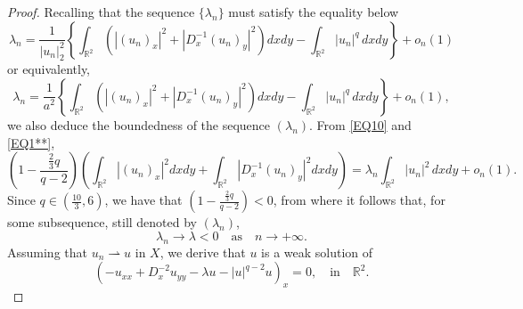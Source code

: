 \documentclass[11pt]{amsart}
\numberwithin{equation}{section}
\begin{document}
{{{\begin{proof}
    Recalling that the sequence $\{\lambda_n\}$  must satisfy the equality below
    $$
    \lambda_n=\frac{1}{|u_n|^{2}_{2}}\left\{\int_{\mathbb{R}^{2}}( |(u_n)_{x}|^{2}+|D^{-1}_{x} (u_n)_{y}|^{2}) dx dy-\int_{\mathbb{R}^2} |u_n|^q \,dxdy\right\}+o_n(1)
    $$
    or equivalently,
    \begin{equation} \label{lambdan}
        \lambda_n=\frac{1}{a^{2}}\left\{\int_{\mathbb{R}^{2}}( |(u_n)_{x}|^{2}+|D^{-1}_{x} (u_n)_{y}|^{2}) dx dy-\int_{\mathbb{R}^2} |u_n|^q \,dxdy\right\}+o_n(1),
    \end{equation}
    we also deduce the boundedness of the sequence $(\lambda_n)$. From \eqref{EQ10} and \eqref{EQ1**},
    $$
    (1-\frac{\frac{2}{3}q}{q-2})\left(\int_{\mathbb{R}^{2}} |(u_n)_{x}|^{2} dx dy+\int_{\mathbb{R}^{2}}|D^{-1}_{x} (u_n)_{y}|^{2} dx dy\right)=\lambda_n\int_{\mathbb{R}^2} |u_n|^2 \,dxdy+o_n(1).
    $$
    {Since $q \in (\frac{10}{3},6)$,} we have that $(1-\frac{\frac{2}{3}q}{q-2})<0$, from where it follows that, for some subsequence, still denoted by $(\lambda_n)$,
    \begin{equation}\label{new}
        \lambda_n \to \lambda<0 \quad \mbox{as} \quad n \to +\infty.
    \end{equation}
    Assuming that $u_n\rightharpoonup u$ in $X$, we derive that  $u $ is a weak solution of
    $$
    \left(-u_{x x}+D_x^{-2} u_{y y}-\lambda u-|u|^{q-2}u\right)_x=0, \quad \mbox{in} \quad \mathbb{R}^2.
    $$
\end{proof}

}}}
\end{document}
